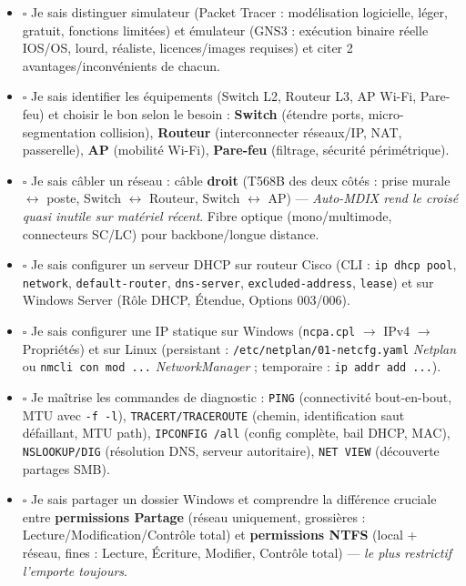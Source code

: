 \documentclass[11pt]{article}
\newcommand{\cle}[1]{{\popxbold\color{popdark}#1}}
\newcounter{popsec}
\newcounter{popsub}
\newcommand{\courssub}[1]{%
  \stepcounter{popsub}%
  \par\vspace{9pt}\noindent{\popxbold\fontsize{11.5}{13}\selectfont\color{popink}{\color{poporange}\thepopsec.\thepopsub}\hspace{6pt}#1}\par\nopagebreak\vspace{4pt}
}
\begin{document}
\courssub{Checklist avant le Bac}
\begin{aretenir}
\begin{itemize}
    \item $\square$ Je sais distinguer \cle{simulateur} (Packet Tracer : modélisation logicielle, léger, gratuit, fonctions limitées) et \cle{émulateur} (GNS3 : exécution binaire réelle IOS/OS, lourd, réaliste, licences/images requises) et citer 2 avantages/inconvénients de chacun.
    \item $\square$ Je sais identifier les équipements (Switch L2, Routeur L3, AP Wi-Fi, Pare-feu) et choisir le bon selon le besoin : \textbf{Switch} (étendre ports, micro-segmentation collision), \textbf{Routeur} (interconnecter réseaux/IP, NAT, passerelle), \textbf{AP} (mobilité Wi-Fi), \textbf{Pare-feu} (filtrage, sécurité périmétrique).
    \item $\square$ Je sais câbler un réseau : câble \textbf{droit} (T568B des deux côtés : prise murale $\leftrightarrow$ poste, Switch $\leftrightarrow$ Routeur, Switch $\leftrightarrow$ AP) — \emph{Auto-MDIX rend le croisé quasi inutile sur matériel récent}. Fibre optique (mono/multimode, connecteurs SC/LC) pour backbone/longue distance.
    \item $\square$ Je sais configurer un serveur \cle{DHCP} sur routeur Cisco (CLI : \texttt{ip dhcp pool}, \texttt{network}, \texttt{default-router}, \texttt{dns-server}, \texttt{excluded-address}, \texttt{lease}) et sur Windows Server (Rôle DHCP, Étendue, Options 003/006).
    \item $\square$ Je sais configurer une IP \cle{statique} sur Windows (\texttt{ncpa.cpl} $\rightarrow$ IPv4 $\rightarrow$ Propriétés) et sur Linux (persistant : \texttt{/etc/netplan/01-netcfg.yaml} \emph{Netplan} ou \texttt{nmcli con mod ...} \emph{NetworkManager} ; temporaire : \texttt{ip addr add ...}).
    \item $\square$ Je maîtrise les commandes de diagnostic : \texttt{PING} (connectivité bout-en-bout, MTU avec \texttt{-f -l}), \texttt{TRACERT/TRACEROUTE} (chemin, identification saut défaillant, MTU path), \texttt{IPCONFIG /all} (config complète, bail DHCP, MAC), \texttt{NSLOOKUP/DIG} (résolution DNS, serveur autoritaire), \texttt{NET VIEW} (découverte partages SMB).
    \item $\square$ Je sais partager un dossier Windows et comprendre la différence cruciale entre \textbf{permissions Partage} (réseau uniquement, grossières : Lecture/Modification/Contrôle total) et \textbf{permissions NTFS} (local + réseau, fines : Lecture, Écriture, Modifier, Contrôle total) — \emph{le plus restrictif l'emporte toujours}.

\end{itemize}
\end{aretenir}
\end{document}
